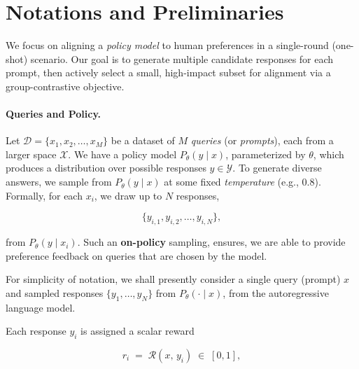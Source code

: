 

\vspace{-0.1in}
\section{Notations and Preliminaries}
\label{sec:notations_preliminaries}

\vspace{-0.1in}
We focus on aligning a \emph{policy model} to human preferences in a single-round (one-shot) scenario. Our goal is to generate multiple candidate responses for each prompt, then actively select a small, high-impact subset for alignment via a group-contrastive objective.

\vspace{-0.1in}
\paragraph{Queries and Policy.}
Let $\mathcal{D} = \{x_1, x_2, \ldots, x_M\}$ be a dataset of $M$ \emph{queries} (or \emph{prompts}), each from a larger space $\mathcal{X}$. We have a policy model $P_\theta(y \mid x)$, parameterized by $\theta$, which produces a distribution over possible responses $y \in \mathcal{Y}$. To generate diverse answers, we sample from $P_\theta(y \mid x)$ at some fixed \emph{temperature} (e.g., $0.8$). Formally, for each $x_i$, we draw up to $N$ responses,

\vspace{-0.1in}
\begin{equation}
   \{y_{i,1}, y_{i,2}, \dots, y_{i,N}\}, 
\end{equation}

\vspace{-0.1in}
from $P_\theta(y \mid x_i)$. Such an \textbf{on-policy} sampling, ensures, we are able to provide preference feedback on queries that are chosen by the model.

\vspace{-0.1in}
For simplicity of notation, we shall presently consider a single query (prompt) \(x\) and sampled responses \(\{y_1,\dots,y_N\}\) from \(P_\theta(\cdot \mid x)\), from the autoregressive language model.

\vspace{-0.1in}
Each response \(y_i\) is assigned a scalar reward

\vspace{-0.1in}
\begin{equation}
r_i \;=\; \mathcal{R}(x,\,y_i) \;\in\; [0,1],
\end{equation}

